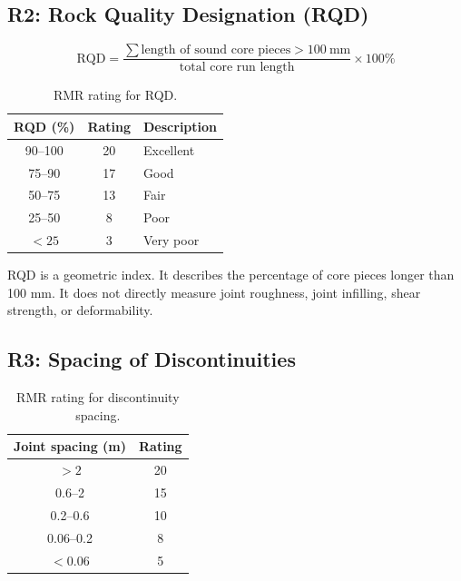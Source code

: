 \documentclass[a4paper,12pt]{article}
\begin{document}
\subsection{R2: Rock Quality Designation (RQD)}

\[
\text{RQD} =
\frac{
\sum \text{length of sound core pieces} > 100~\text{mm}
}
{\text{total core run length}}
\times 100\%
\]

\begin{table}[H]
\centering
\small
\begin{tabular}{c c l}
\toprule
\textbf{RQD (\%)} & \textbf{Rating} & \textbf{Description} \\
\midrule
90--100 & 20 & Excellent \\
75--90 & 17 & Good \\
50--75 & 13 & Fair \\
25--50 & 8 & Poor \\
\(<25\) & 3 & Very poor \\
\bottomrule
\end{tabular}
\caption{RMR rating for RQD.}
\label{tab:rmr_rqd}
\end{table}

\begin{warnbox}
RQD is a geometric index. It describes the percentage of core pieces longer than
100 mm. It does not directly measure joint roughness, joint infilling, shear strength,
or deformability.
\end{warnbox}

\subsection{R3: Spacing of Discontinuities}

\begin{table}[H]
\centering
\small
\begin{tabular}{c c}
\toprule
\textbf{Joint spacing (m)} & \textbf{Rating} \\
\midrule
\(>2\) & 20 \\
0.6--2 & 15 \\
0.2--0.6 & 10 \\
0.06--0.2 & 8 \\
\(<0.06\) & 5 \\
\bottomrule
\end{tabular}
\caption{RMR rating for discontinuity spacing.}
\label{tab:rmr_spacing}
\end{table}
\end{document}
